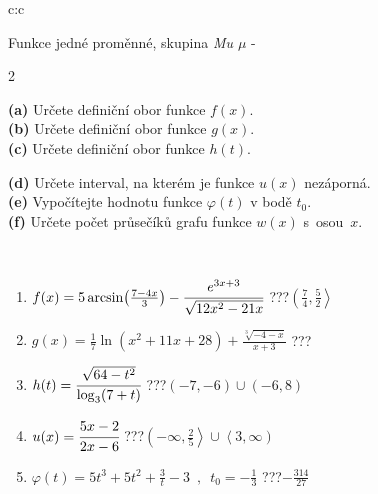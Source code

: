 \documentclass[10pt]{report}
\begin{document}
\begin{tabular}{c:c}
\begin{minipage}[c][104.5mm][t]{0.5\linewidth}
\begin{center}
\vspace{7mm}
{\huge Funkce jedné proměnné, skupina \textit{Mu $\mu$} -}\\[5mm]
\begin{minipage}{0.95\linewidth}
\begin{center}
{\small \begin{multicols}{2} \raggedright
\textbf{(a)} Určete definiční obor funkce \(f(x)\). \\[1mm]
\textbf{(b)} Určete definiční obor funkce \(g(x)\). \\[1mm]
\textbf{(c)} Určete definiční obor funkce \(h(t)\). \par \columnbreak
\textbf{(d)} Určete interval, na kterém je funkce \(u(x)\) nezáporná. \\[1mm]
\textbf{(e)} Vypočítejte hodnotu funkce \(\varphi(t)\) v bodě \(t_0\). \\[1mm]
\textbf{(f)} Určete počet průsečíků grafu funkce \(w(x)\) s~osou~\(x\). \\[1mm]
\end{multicols}
}
\end{center}
\end{minipage}
\\[4mm]
\begin{minipage}{0.79\linewidth}
\begin{center}
\begin{varwidth}{\linewidth}
\begin{enumerate}
\small
\item $f(x) = 5\arcsin\!\left( \frac{7-4x}{3} \right) - \cfrac{e^{3x+3}}{\sqrt{12x^2-21x}}$\quad \dotfill\; ???\;\dotfill \quad $\left(\frac{7}{4} , \frac{5}{2}\right\rangle$
\item $g(x) = \frac{1}{7} \ln{\!(x^2+11x+28)}+\frac{\sqrt[3]{-4-x}}{x+3}$\quad \dotfill\; ???\;\dotfill {}
\item $h(t) = \cfrac{\sqrt{64-t^2}}{\log_3(7+t)}$\quad \dotfill\; ???\;\dotfill \quad $\left(-7 , -6\right)\cup\left(-6 , 8\right)$
\item $u(x) = \cfrac{5x-2}{2x-6}$\quad \dotfill\; ???\;\dotfill \quad $\left(-\infty , \frac{2}{5}\right\rangle\cup\left\langle3 , \infty\right)$
\item $\varphi(t) = 5t^3+5t^2+\frac{3}{t}-3 \enspace , \enspace t_0=-\frac{1}{3}$\quad \dotfill\; ???\;\dotfill \quad $-\frac{314}{27}$

\end{enumerate}
\end{varwidth}
\end{center}
\end{minipage}
\end{center}
\end{minipage}
\end{tabular}
\end{document}
